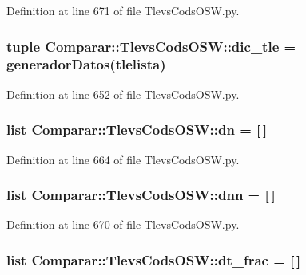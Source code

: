 \-Definition at line 671 of file \-Tlevs\-Cods\-O\-S\-W.\-py.

\subsubsection[{dic\-\_\-tle}]{\setlength{\rightskip}{0pt plus 5cm}tuple {\bf \-Comparar\-::\-Tlevs\-Cods\-O\-S\-W\-::dic\-\_\-tle} = generador\-Datos({\bf tlelista})}\label{namespace_comparar_1_1_tlevs_cods_o_s_w_a15e6e9937287f3d218fee795c481de64}


\-Definition at line 652 of file \-Tlevs\-Cods\-O\-S\-W.\-py.

\subsubsection[{dn}]{\setlength{\rightskip}{0pt plus 5cm}list {\bf \-Comparar\-::\-Tlevs\-Cods\-O\-S\-W\-::dn} = [$\,$]}\label{namespace_comparar_1_1_tlevs_cods_o_s_w_ad820f3df2061696288358169c519f323}


\-Definition at line 664 of file \-Tlevs\-Cods\-O\-S\-W.\-py.

\subsubsection[{dnn}]{\setlength{\rightskip}{0pt plus 5cm}list {\bf \-Comparar\-::\-Tlevs\-Cods\-O\-S\-W\-::dnn} = [$\,$]}\label{namespace_comparar_1_1_tlevs_cods_o_s_w_ab56aaf1095eddbb998d0571d051ca5df}


\-Definition at line 670 of file \-Tlevs\-Cods\-O\-S\-W.\-py.

\subsubsection[{dt\-\_\-frac}]{\setlength{\rightskip}{0pt plus 5cm}list {\bf \-Comparar\-::\-Tlevs\-Cods\-O\-S\-W\-::dt\-\_\-frac} = [$\,$]}\label{namespace_comparar_1_1_tlevs_cods_o_s_w_acb74f49825b48b679501305ccf64bff8}


